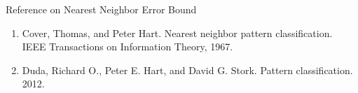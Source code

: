 \documentclass[compress,blue]{beamer}
\begin{document}
\begin{frame}{Reference on Nearest Neighbor Error Bound}
	\begin{enumerate}
		\item Cover, Thomas, and Peter Hart. Nearest neighbor pattern classification. IEEE Transactions on Information Theory, 1967.
		\item Duda, Richard O., Peter E. Hart, and David G. Stork. Pattern classification. 2012.
	\end{enumerate}
\end{frame}
\end{document}
